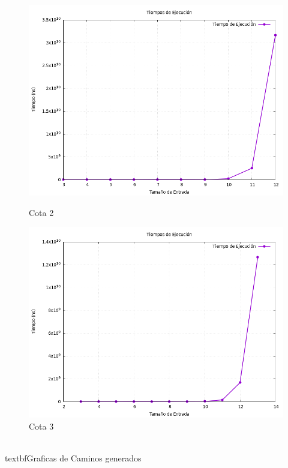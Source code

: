\documentclass[11pt,openany]{book}
\begin{document}
\begin{figure}[H]
\begin{minipage}{.48\textwidth}
          \includegraphics[width=1\linewidth]{assets/Img/grafico_tiempos2.png}
          \caption{Cota 2}
          \label{fig:Cota 2}
    \end{minipage}
\begin{minipage}{.48\textwidth}
      \centering
      \includegraphics[width=1\linewidth]{assets/Img/grafico_tiempos3.png}
      \caption{Cota 3}
      \label{fig:Cota 3}
\end{minipage}
\end{figure}
\\textbf{Graficas de Caminos generados }
\end{document}
